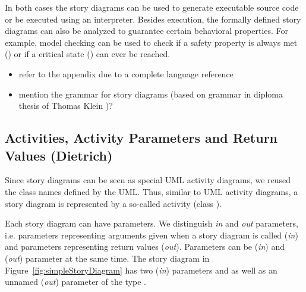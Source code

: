 
In both cases the story diagrams can be used to generate executable source code or be executed using an interpreter.
Besides execution, the formally defined story diagrams can also be analyzed to guarantee certain behavioral properties.
For example, model checking can be used to check if a safety property is always met () or if a critical state () can ever be reached. 



\begin{itemize}
  \item refer to the appendix due to a complete language reference
  \item mention the grammar for story diagrams (based on grammar in diploma thesis of Thomas Klein \cite{Kle99})?
\end{itemize}


\subsection{Activities, Activity Parameters and Return Values (Dietrich)}

Since story diagrams can be seen as special UML activity diagrams, we reused the class names defined by the UML.
Thus, similar to UML activity diagrams, a story diagram is represented by a so-called activity (class ).

Each story diagram can have parameters.
We distinguish \emph{in} and \emph{out} parameters,
i.e. parameters representing arguments given when a story diagram is called (\emph{in})
and parameters representing return values (\emph{out}).
Parameters can be (\emph{in}) and (\emph{out}) parameter at the same time.
The story diagram in Figure~\ref{fig:simpleStoryDiagram} has two (\emph{in}) parameters  and 
as well as an unnamed (\emph{out}) parameter of the type .


